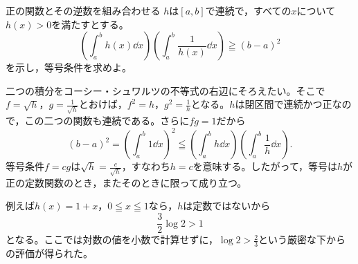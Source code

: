 \begin{example}{正の関数とその逆数を組み合わせる}
$h$は$[a,b]$で連続で，すべての$x$について$h(x)>0$を満たすとする。
\[
 \left(\int_a^b h(x)\dd x\right)
 \left(\int_a^b\frac1{h(x)}\dd x\right)
 \geqq(b-a)^2
\]
を示し，等号条件を求めよ。
\end{example}

二つの積分をコーシー・シュワルツの不等式の右辺にそろえたい。そこで$f=\sqrt h$，$g=\frac1{\sqrt h}$とおけば，$f^2=h$，$g^2=\frac1h$となる。$h$は閉区間で連続かつ正なので，この二つの関数も連続である。さらに$fg=1$だから
\[
 (b-a)^2=\left(\int_a^b1\dd x\right)^2
 \leqq\left(\int_a^b h\dd x\right)
       \left(\int_a^b\frac1h\dd x\right).
\]
等号条件$f=cg$は$\sqrt h=\frac c{\sqrt h}$，すなわち$h=c$を意味する。したがって，等号は$h$が正の定数関数のとき，またそのときに限って成り立つ。

例えば$h(x)=1+x$，$0\leqq x\leqq1$なら，$h$は定数ではないから
\[
 \frac32\log2>1
\]
となる。ここでは対数の値を小数で計算せずに，$\log2>\frac23$という厳密な下からの評価が得られた。

